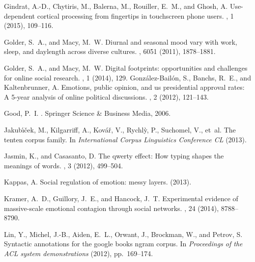 \documentclass[letterpaper]{sig-alternate-2013}
\begin{document}
\begin{thebibliography}{10}
{\sc Gindrat, A.-D., Chytiris, M., Balerna, M., Rouiller, E.~M., and Ghosh, A.}
\newblock Use-dependent cortical processing from fingertips in touchscreen
  phone users.
, 1 (2015), 109--116.

{\sc Golder, S.~A., and Macy, M.~W.}
\newblock Diurnal and seasonal mood vary with work, sleep, and daylength across
  diverse cultures.
, 6051 (2011), 1878--1881.

{\sc Golder, S.~A., and Macy, M.~W.}
\newblock Digital footprints: opportunities and challenges for online social
  research.
, 1 (2014), 129.
\vfill\eject
{}
{\sc Gonz{\'a}lez-Bail{\'o}n, S., Banchs, R.~E., and Kaltenbrunner, A.}
\newblock Emotions, public opinion, and us presidential approval rates: A
  5-year analysis of online political discussions.
, 2 (2012), 121--143.

{\sc Good, P.~I.}
.
\newblock Springer Science \& Business Media, 2006.

{\sc Jakub{\'\i}{\v{c}}ek, M., Kilgarriff, A., Kov{\'a}{\v{r}}, V., Rychl{\`y},
  P., Suchomel, V., et~al.}
\newblock The tenten corpus family.
\newblock In {\em International Corpus Linguistics Conference CL\/} (2013).

{\sc Jasmin, K., and Casasanto, D.}
\newblock The qwerty effect: How typing shapes the meanings of words.
, 3 (2012), 499--504.

{\sc Kappas, A.}
\newblock Social regulation of emotion: messy layers.
 (2013).

{\sc Kramer, A.~D., Guillory, J.~E., and Hancock, J.~T.}
\newblock Experimental evidence of massive-scale emotional contagion through
  social networks.
, 24 (2014),
  8788--8790.

{\sc Lin, Y., Michel, J.-B., Aiden, E.~L., Orwant, J., Brockman, W., and
  Petrov, S.}
\newblock Syntactic annotations for the google books ngram corpus.
\newblock In {\em Proceedings of the ACL system demonstrations\/} (2012),
  pp.~169--174.


\end{thebibliography}
\end{document}
